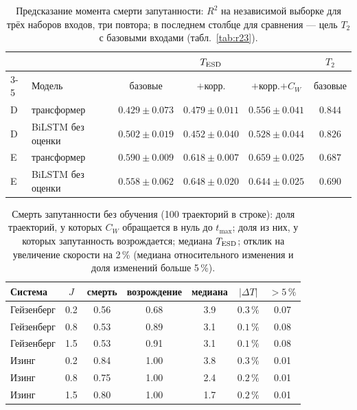 \documentclass[12pt,a4paper]{report}
\numberwithin{equation}{chapter}
\begin{document}
\begin{table}[h]
\centering
\caption{Предсказание момента смерти запутанности: $R^2$ на независимой
выборке для трёх наборов входов, три повтора; в последнем столбце для
сравнения --- цель $T_2$ с базовыми входами (табл.~\ref{tab:r23}).}
\label{tab:r24}
\small
\begin{tabular}{@{}llcccc@{}}
\toprule
 & & \multicolumn{3}{c}{$T_{\rm ESD}$} & $T_2$ \\
\cmidrule(lr){3-5}
 & Модель & базовые & $+$корр. & $+$корр.$+C_W$ & базовые \\
\midrule
D & трансформер & $0.429\pm0.073$ & $0.479\pm0.011$ & $\mathbf{0.556\pm0.041}$ & $0.844$ \\
D & BiLSTM без оценки & $0.502\pm0.019$ & $0.452\pm0.040$ & $0.528\pm0.044$ & $0.826$ \\
E & трансформер & $0.590\pm0.009$ & $0.618\pm0.007$ & $\mathbf{0.659\pm0.025}$ & $0.687$ \\
E & BiLSTM без оценки & $0.558\pm0.062$ & $0.648\pm0.020$ & $0.644\pm0.025$ & $0.690$ \\
\bottomrule
\end{tabular}
\end{table}

\begin{table}[h]
\centering
\caption{Смерть запутанности без обучения (100 траекторий в строке): доля
траекторий, у которых $C_W$ обращается в нуль до $t_{\max}$; доля из них, у
которых запутанность возрождается; медиана $T_{\rm ESD}$; отклик на
увеличение скорости на 2\,\% (медиана относительного изменения и доля
изменений больше 5\,\%).}
\label{tab:r24b}
\small
\begin{tabular}{@{}lcccccc@{}}
\toprule
Система & $J$ & смерть & возрождение & медиана & $|\Delta T|$ & $>5\,\%$ \\
\midrule
Гейзенберг & 0.2 & 0.56 & 0.68 & 3.9 & $0.3\,\%$ & 0.07 \\
Гейзенберг & 0.8 & 0.53 & 0.89 & 3.1 & $0.1\,\%$ & 0.08 \\
Гейзенберг & 1.5 & 0.53 & 0.91 & 3.1 & $0.1\,\%$ & 0.08 \\
Изинг & 0.2 & 0.84 & 1.00 & 3.8 & $0.3\,\%$ & 0.01 \\
Изинг & 0.8 & 0.75 & 1.00 & 2.4 & $0.2\,\%$ & 0.01 \\
Изинг & 1.5 & 0.80 & 1.00 & 1.7 & $0.2\,\%$ & 0.01 \\
\bottomrule
\end{tabular}
\end{table}
\end{document}
